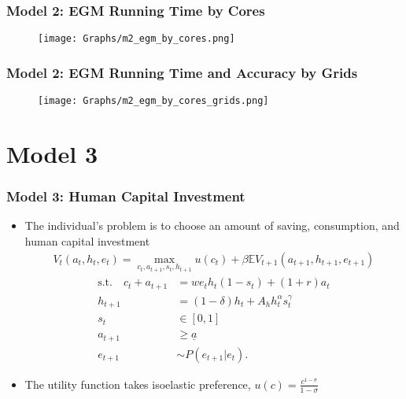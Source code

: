 \documentclass[xcolor=x11names,compress]{beamer}
\renewcommand{\(}{\begin{columns}}
\renewcommand{\)}{\end{columns}}
\newcommand{\<}[1]{\begin{column}{#1}}
\renewcommand{\>}{\end{column}}
\begin{document}
\setcounter{subfigure}{0}
\begin{frame}
\frametitle{Model 2: EGM Running Time by Cores}
\begin{figure}
\begin{center}
\texttt{[image: Graphs/m2\_egm\_by\_cores.png]}
\end{center}
\end{figure}
\end{frame}




\setcounter{subfigure}{0}
\begin{frame}
\frametitle{Model 2: EGM Running Time and Accuracy by Grids}
\begin{figure}
\begin{center}
\texttt{[image: Graphs/m2\_egm\_by\_cores\_grids.png]}
\end{center}
\end{figure}
\end{frame}





\section{Model 3}
\begin{frame}
\frametitle{Model 3: Human Capital Investment}
\begin{itemize}
\item The individual's problem is to choose an amount of saving, consumption, and human capital investment
\begin{align*}
V_t(a_{t},h_{t},e_t) = \max_{c_t,a_{t+1},s_{t},h_{t+1}} u(c_{t}) + \beta \mathbb{E} V_{t+1}(a_{t+1},h_{t+1},e_{t+1})
\end{align*}
\begin{align*}
\text{s.t.} \quad c_t + a_{t+1} 	&= w e_t h_t (1-s_t) + (1+r)a_t \\
h_{t+1} 		&= (1-\delta)h_t + A_h h_t^\alpha s_t^\gamma\\
s_t 			& \in [0,1]\\
a_{t+1} 		&\geq \underline{a}\\
e_{t+1} 		&\sim P(e_{t+1}|e_t).
\end{align*}
\item The utility function takes isoelastic preference, $u(c) = \frac{c^{1-\sigma}}{1-\sigma}$
\end{itemize}
\end{frame}
\end{document}
